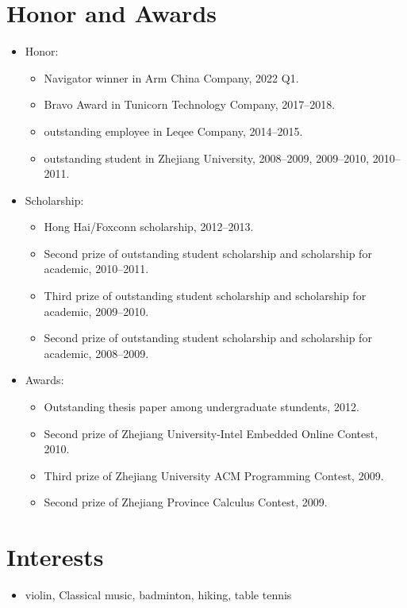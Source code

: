 \documentclass[letterpaper]{article}
\begin{document}
\section*{Honor and Awards}
\begin{itemize}
    \item Honor:
        \begin{itemize}
            \item Navigator winner in Arm China Company, 2022 Q1.
            \item Bravo Award in Tunicorn Technology Company, 2017--2018.
            \item outstanding employee in Leqee Company, 2014--2015.
            \item outstanding student in Zhejiang University, 2008--2009, 2009--2010, 2010--2011.
        \end{itemize}
    \item Scholarship:
        \begin{itemize}
            \item Hong Hai/Foxconn scholarship, 2012--2013.	
            \item Second prize of outstanding student scholarship and scholarship for academic, 2010--2011.
            \item Third prize of outstanding student scholarship and scholarship for academic, 2009--2010.
            \item Second prize of outstanding student scholarship and scholarship for academic, 2008--2009.
        \end{itemize}
    \item Awards:
        \begin{itemize}
            \item Outstanding thesis paper among undergraduate stundents, 2012.
            \item Second prize of Zhejiang University-Intel Embedded Online Contest, 2010.
            \item Third prize of Zhejiang University ACM Programming Contest, 2009.
            \item Second prize of Zhejiang Province Calculus Contest, 2009.
        \end{itemize}
\end{itemize}


\section*{Interests}
\begin{itemize}
\item violin, Classical music, badminton, hiking, table tennis
\end{itemize}

\bigskip
\begin{center}
    \begin{footnotesize}
    \end{footnotesize}
\end{center}
\end{document}
